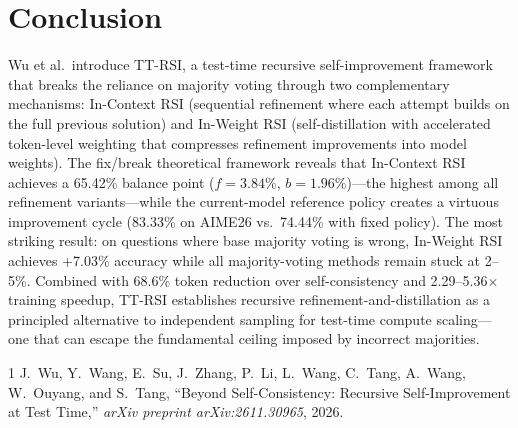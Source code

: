 \documentclass[11pt,a4paper]{article}
\begin{document}
\section{Conclusion}
Wu et al.\ introduce TT-RSI, a test-time recursive self-improvement framework that breaks the reliance on majority voting through two complementary mechanisms: In-Context RSI (sequential refinement where each attempt builds on the full previous solution) and In-Weight RSI (self-distillation with accelerated token-level weighting that compresses refinement improvements into model weights). The fix/break theoretical framework reveals that In-Context RSI achieves a 65.42\% balance point ($f{=}3.84\%$, $b{=}1.96\%$)---the highest among all refinement variants---while the current-model reference policy creates a virtuous improvement cycle (83.33\% on AIME26 vs.\ 74.44\% with fixed policy). The most striking result: on questions where base majority voting is wrong, In-Weight RSI achieves +7.03\% accuracy while all majority-voting methods remain stuck at 2--5\%. Combined with 68.6\% token reduction over self-consistency and 2.29--5.36$\times$ training speedup, TT-RSI establishes recursive refinement-and-distillation as a principled alternative to independent sampling for test-time compute scaling---one that can escape the fundamental ceiling imposed by incorrect majorities.

\begin{thebibliography}{1}
J.~Wu, Y.~Wang, E.~Su, J.~Zhang, P.~Li, L.~Wang, C.~Tang, A.~Wang, W.~Ouyang, and S.~Tang,
``Beyond Self-Consistency: Recursive Self-Improvement at Test Time,''
\textit{arXiv preprint arXiv:2611.30965}, 2026.
\end{thebibliography}
\end{document}
